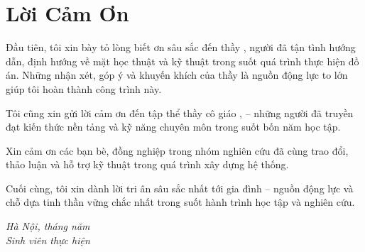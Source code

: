 \chapter*{Lời Cảm Ơn}

Đầu tiên, tôi xin bày tỏ lòng biết ơn sâu sắc đến thầy \textbf{\advisor{}}, người đã tận tình hướng dẫn, định hướng về mặt học thuật và kỹ thuật trong suốt quá trình thực hiện đồ án. Những nhận xét, góp ý và khuyến khích của thầy là nguồn động lực to lớn giúp tôi hoàn thành công trình này.

Tôi cũng xin gửi lời cảm ơn đến tập thể thầy cô giáo \textbf{\department{}}, \textbf{\university{}} -- những người đã truyền đạt kiến thức nền tảng và kỹ năng chuyên môn trong suốt bốn năm học tập.

Xin cảm ơn các bạn bè, đồng nghiệp trong nhóm nghiên cứu đã cùng trao đổi, thảo luận và hỗ trợ kỹ thuật trong quá trình xây dựng hệ thống.

Cuối cùng, tôi xin dành lời tri ân sâu sắc nhất tới gia đình -- nguồn động lực và chỗ dựa tinh thần vững chắc nhất trong suốt hành trình học tập và nghiên cứu.

\vspace{1.5cm}
\begin{flushright}
\textit{Hà Nội, tháng \the\month{} năm \the\year{}}\\[6pt]
\textit{Sinh viên thực hiện}\\[24pt]
\authorname{}
\end{flushright}

\clearpage
